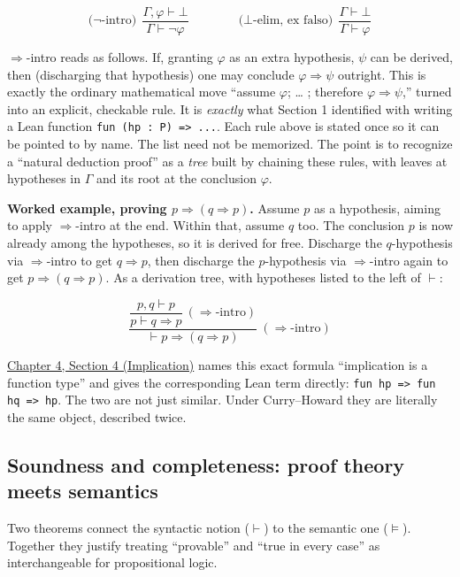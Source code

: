 \[
\text{($\neg$-intro)}\ \ \frac{\Gamma, \varphi \vdash \bot}{\Gamma \vdash \neg\varphi}
\qquad\qquad
\text{($\bot$-elim, ex falso)}\ \ \frac{\Gamma \vdash \bot}{\Gamma \vdash \varphi}
\]

\(\Rightarrow\)-intro reads as follows. If, granting \(\varphi\) as an extra hypothesis, \(\psi\) can be derived, then (discharging that hypothesis) one may conclude \(\varphi \Rightarrow \psi\) outright. This is exactly the ordinary mathematical move ``assume \(\varphi\); \ldots{} ; therefore \(\varphi
\Rightarrow \psi\),'' turned into an explicit, checkable rule. It is \emph{exactly} what Section 1 identified with writing a Lean function \texttt{fun (hp : P) => ...}. Each rule above is stated once so it can be pointed to by name. The list need not be memorized. The point is to recognize a ``natural deduction proof'' as a \emph{tree} built by chaining these rules, with leaves at hypotheses in \(\Gamma\) and its root at the conclusion \(\varphi\).

\textbf{Worked example, proving \(p \Rightarrow (q \Rightarrow p)\).} Assume \(p\) as a hypothesis, aiming to apply \(\Rightarrow\)-intro at the end. Within that, assume \(q\) too. The conclusion \(p\) is now already among the hypotheses, so it is derived for free. Discharge the \(q\)-hypothesis via \(\Rightarrow\)-intro to get \(q \Rightarrow p\), then discharge the \(p\)-hypothesis via \(\Rightarrow\)-intro again to get \(p \Rightarrow (q \Rightarrow p)\). As a derivation tree, with hypotheses listed to the left of \(\vdash\):

\[
\dfrac{\dfrac{p, q \vdash p}{p \vdash q \Rightarrow p}\ (\Rightarrow\text{-intro})}
{\vdash p \Rightarrow (q \Rightarrow p)}\ (\Rightarrow\text{-intro})
\]

\hyperref[sec:04-propositions-and-proofs:04-implication:1]{Chapter 4, Section 4 (Implication)} names this exact formula ``implication is a function type'' and gives the corresponding Lean term directly: \texttt{fun hp => fun hq => hp}. The two are not just similar. Under Curry--Howard they are literally the same object, described twice.

\subsection{Soundness and completeness: proof theory meets semantics}\label{sec:04-propositions-and-proofs:02-logic-recap:5}

Two theorems connect the syntactic notion (\(\vdash\)) to the semantic one (\(\models\)). Together they justify treating ``provable'' and ``true in every case'' as interchangeable for propositional logic.

